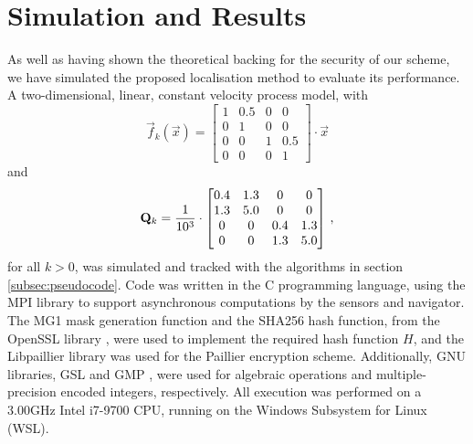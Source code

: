 \documentclass[10pt,letterpaper,oneside,twocolumn,journal]{IEEEtran}
\theoremstyle{definition}
\theoremstyle{definition}
\theoremstyle{remark}
\begin{document}
\section{Simulation and Results} \label{sec:sim_and_results}
As well as having shown the theoretical backing for the security of our scheme, we have simulated the proposed localisation method to evaluate its performance. A two-dimensional, linear, constant velocity process model, with
\begin{equation*}
    \vec{f}_k(\vec{x}) =
    \begin{bmatrix}
        1 & 0.5 & 0 & 0\\
        0 & 1 & 0 & 0\\
        0 & 0 & 1 & 0.5\\
        0 & 0 & 0 & 1
    \end{bmatrix} \cdot \vec{x}
\end{equation*}
and
\begin{equation*}
    {\ensuremath{{\mathbf{Q}}}}_k = \frac{1}{10^3} \cdot
    \begin{bmatrix}
        0.4 & 1.3 & 0 & 0\\
        1.3 & 5.0 & 0 & 0\\
        0 & 0 & 0.4 & 1.3\\
        0 & 0 & 1.3 & 5.0
    \end{bmatrix}\,,
\end{equation*}
for all $k>0$, was simulated and tracked with the algorithms in section \ref{subsec:pseudocode}. Code was written in the C programming language, using the MPI library \cite{theopenmpiprojectOpenMPI2020} to support asynchronous computations by the sensors and navigator. The MG1 mask generation function and the SHA256 hash function, from the OpenSSL library \cite{theopensslprojectOpenSSL2020}, were used to implement the required hash function $H$, and the Libpaillier library \cite{bethencourtLibpaillier2010} was used for the Paillier encryption scheme. Additionally, GNU libraries, GSL \cite{thegsldevelopmentteamGSLGNUScientific2019} and GMP \cite{granlundGMPGNUMultiple2020}, were used for algebraic operations and multiple-precision encoded integers, respectively. All execution was performed on a 3.00GHz Intel i7-9700 CPU, running on the Windows Subsystem for Linux (WSL).
\end{document}
